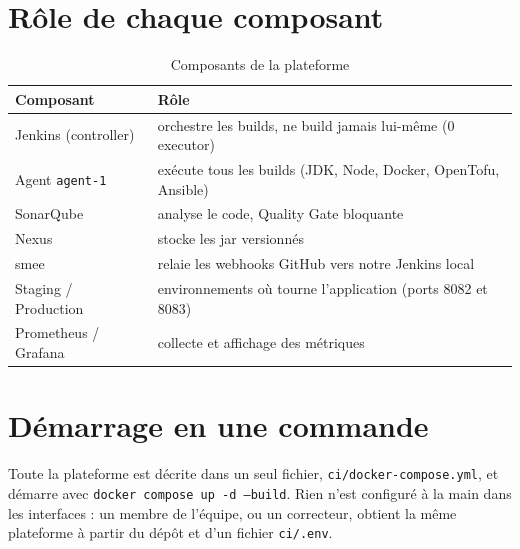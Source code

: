 \documentclass[11pt,a4paper]{report}
\begin{document}
\section{Rôle de chaque composant}
\begin{table}[H]
  \centering
  \begin{tabularx}{\textwidth}{@{}lY@{}}
    \toprule
    \textbf{Composant} & \textbf{Rôle} \\
    \midrule
    Jenkins (controller) & orchestre les builds, ne build jamais lui-même (0 executor) \\
    Agent \texttt{agent-1} & exécute tous les builds (JDK, Node, Docker, OpenTofu, Ansible) \\
    SonarQube & analyse le code, Quality Gate bloquante \\
    Nexus & stocke les jar versionnés \\
    smee & relaie les webhooks GitHub vers notre Jenkins local \\
    Staging / Production & environnements où tourne l'application (ports 8082 et 8083) \\
    Prometheus / Grafana & collecte et affichage des métriques \\
    \bottomrule
  \end{tabularx}
  \caption{Composants de la plateforme}
\end{table}

\section{Démarrage en une commande}
Toute la plateforme est décrite dans un seul fichier, \texttt{ci/docker-compose.yml}, et démarre avec \texttt{docker compose up -d --build}. Rien n'est configuré à la main dans les interfaces : un membre de l'équipe, ou un correcteur, obtient la même plateforme à partir du dépôt et d'un fichier \texttt{ci/.env}.
\end{document}
